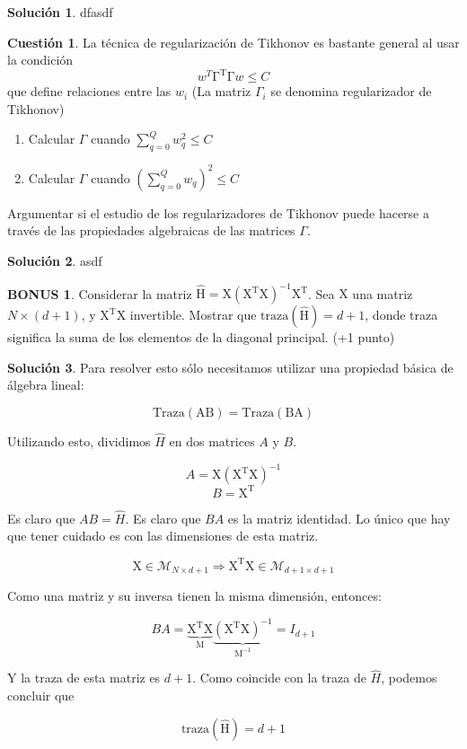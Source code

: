 \documentclass[a4paper, 11pt]{article}
\theoremstyle{definition}
\newtheorem{cuestion}{Cuestión}
\newtheorem*{solucion}{Solución}
\newtheorem*{bonus}{BONUS}
\begin{document}
  \begin{solucion}
    dfasdf
  \end{solucion}


  \begin{cuestion}
    La técnica de regularización de Tikhonov es bastante general al usar la condición
    \[
    w^T\mathrm{\Gamma^T\Gamma}w\leq C
    \]
    que define relaciones entre las $w_i$ (La matriz $\Gamma_i$ se denomina regularizador de Tikhonov)
    \begin{enumerate}
    \item Calcular $\Gamma$ cuando $\sum_{q=0}^Q w_q^2 \leq C$
    \item Calcular $\Gamma$ cuando $(\sum_{q=0}^Q w_q)^2 \leq C$
    \end{enumerate}
    Argumentar si el estudio de los regularizadores de Tikhonov puede hacerse a través de las propiedades algebraicas de las matrices $\Gamma$.
  \end{cuestion}

  \begin{solucion}
    asdf
  \end{solucion}

  \begin{bonus}
    Considerar la matriz $\hat{\mathrm{H}}=\mathrm{X(X^TX)^{-1}X^T}$. Sea $\mathrm{X}$ una matriz  $N\times (d+1)$, y $\mathrm{X^TX}$ invertible. Mostrar que $\mathrm{traza(\hat{H})}=d+1$, donde traza significa la suma de los elementos de la diagonal principal. (+1 punto)
  \end{bonus}

  \begin{solucion}
    Para resolver esto sólo necesitamos utilizar una propiedad básica de álgebra lineal:

    $$ \mathrm{Traza(AB)}=\mathrm{Traza(BA)}$$

    Utilizando esto, dividimos $\hat{H}$ en dos matrices $A$ y $B$.

    $$A = \mathrm{X(X^TX)^{-1}}$$
    $$B = \mathrm{X^T}$$

    Es claro que $AB=\hat{H}$. Es claro que $BA$ es la matriz identidad. Lo único que hay que tener cuidado es con las dimensiones de esta matriz.

    $$\mathrm{X} \in \mathcal{M}_{N \times d+1} \Rightarrow \mathrm{X^TX} \in \mathcal{M}_{d+1 \times d+1}$$

    Como una matriz y su inversa tienen la misma dimensión, entonces:

    $$BA=\mathrm{\underbrace{X^TX}_M\underbrace{(X^TX)^{-1}}_{M^{-1}}}=I_{d+1}$$

    Y la traza de esta matriz es $d+1$. Como coincide con la traza de $\hat{H}$, podemos concluir que

    $$\mathrm{traza(\hat{H})}=d+1$$
  \end{solucion}
\end{document}
